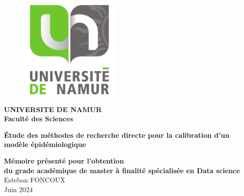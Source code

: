 \documentclass[french]{report}
\author{Esteban Foncoux}
\begin{document}
\begin{titlepage}

    \begin{figure}[h!]
        \begin{center}
            \includegraphics[width=5cm]{unamur.png}
        \end{center}
    \end{figure}

    \begin{center}
        \textbf{\LARGE{UNIVERSITE DE NAMUR}} \\
        \vspace{0.5cm}
        \textbf{\LARGE{Faculté des Sciences}}
    \end{center}



    \vspace{1cm}

    \begin{center}

        \textrm{ \textbf{\LARGE{Étude des méthodes de recherche directe pour la calibration d’un modèle épidémiologique}}}


    \end{center}

    \vspace{0.5cm}

    \begin{center}
        \LARGE{ }
    \end{center}
    \vspace{3cm}


    \begin{center}
        \textbf{Mémoire présenté pour l'obtention\\du grade académique de master à finalité spécialisée en Data science } \\
        Esteban FONCOUX \\
        Juin 2024
    \end{center}


\end{titlepage}
\end{document}

